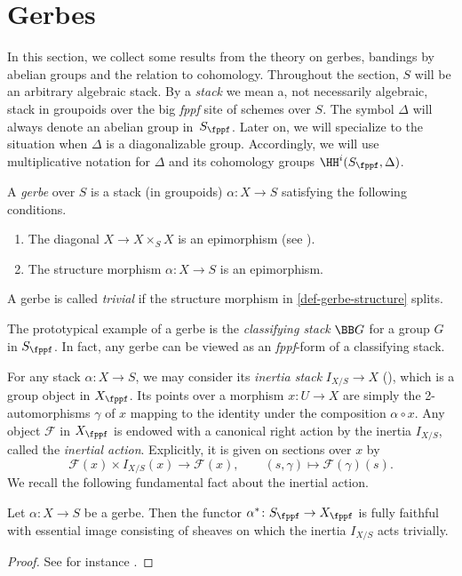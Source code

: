 \section{Gerbes}
\label{sec:gerbes-and-twisted}
In this section, we collect some results from the theory on gerbes,
bandings by abelian groups and the relation to cohomology.
Throughout the section, $S$ will be an arbitrary algebraic stack.
By a \emph{stack} we mean a, not necessarily algebraic, stack in groupoids over the
big \emph{fppf} site of schemes over $S$. 
The symbol $\Delta$ will always denote an abelian group
in~$S_\fppf$. 
Later on, we will specialize to the situation when $\Delta$ is a diagonalizable group.
Accordingly, we will use multiplicative notation for
$\Delta$ and its cohomology groups $\HH^i(S_\fppf, \Delta)$.

\begin{definition}
A \emph{gerbe} over $S$ is a stack (in groupoids) $\alpha\colon X \to S$ satisfying the following
conditions.
\begin{enumerate}
\item
The diagonal $X \to X\times_S X$ is an epimorphism (see \cite[Definition~3.6]{lmb2000}).
\item
\label{def-gerbe-structure}
The structure morphism $\alpha\colon X \to S$ is an epimorphism.
\end{enumerate}
A gerbe is called \emph{trivial} if the structure morphism in \ref{def-gerbe-structure} splits.
\end{definition}

The prototypical example of a gerbe is the \emph{classifying stack} $\BB G$
for a group $G$ in $S_\fppf$.
In fact, any gerbe can be viewed as an \emph{fppf}-form of a classifying stack.

For any stack $\alpha\colon X \to S$,
we may consider its \emph{inertia stack} $I_{X/S} \to X$ (\cite[]{stacks-project}),
which is a group object in $X_\fppf$.
Its points over a morphism $x \colon U \to X$ are simply the 2-automorphisms $\gamma$ of $x$
mapping to the identity under the composition $\alpha \circ x$.
Any object $\mathcal{F}$ in $X_\fppf$ is endowed with a canonical right action by the inertia $I_{X/S}$,
called the \emph{inertial action}.
Explicitly, it is given on sections over $x$ by
\begin{equation}
\label{eq-inertial-action}
\mathcal{F}(x)\times I_{X/S}(x) \to \mathcal{F}(x),\qquad
(s, \gamma) \mapsto \mathcal{F}(\gamma)(s).
\end{equation}
We recall the following fundamental fact about the inertial action.
\begin{proposition}
\label{p-gerbe-pb-ff}
Let $\alpha\colon X \to S$ be a gerbe.
Then the functor $\alpha^{*}\colon S_\fppf \to X_\fppf$ is fully faithful with essential
image consisting of sheaves on which the inertia $I_{X/S}$ acts trivially.
\end{proposition}
\begin{proof}
See for instance \cite[Lemma~2.1.1.17]{lieblich2004}.
\end{proof}

